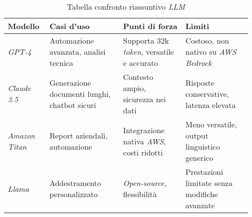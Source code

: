 \begin{table}[H]
    \centering
    \begin{tabularx}{\textwidth}{|>{\centering\arraybackslash}X|>{\centering\arraybackslash}X|>{\centering\arraybackslash}X|>{\centering\arraybackslash}X|}
        \hline
        \rowcolor{green!30} %
        \textbf{Modello} & \textbf{Casi d'uso} & \textbf{Punti di forza} & \textbf{Limiti} \\
        \hline
        \textit{GPT-4} & Automazione avanzata, analisi tecnica & Supporta 32k \textit{token}, versatile e accurato & Costoso, non nativo su \textit{AWS Bedrock} \\
        \hline
        \textit{Claude 3.5} & Generazione documenti lunghi, chatbot sicuri & Contesto ampio, sicurezza nei dati & Risposte conservative, latenza elevata \\
        \hline
        \textit{Amazon Titan} & Report aziendali, automazione & Integrazione nativa \textit{AWS}, costi ridotti & Meno versatile, output linguistico generico \\
        \hline
        \textit{Llama} & Addestramento personalizzato & \textit{Open-source}, flessibilità & Prestazioni limitate senza modifiche avanzate \\
        \hline
    \end{tabularx}
    \caption{Tabella confronto riassuntivo \textit{LLM}}
    \label{tab:confronto-lllm}
\end{table}
